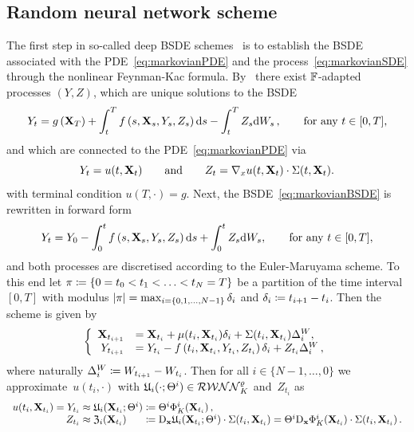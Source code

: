 \subsection{Random neural network scheme}
The first step in so-called deep BSDE schemes~\cite{E2017DeepEquations, Han2018SolvingLearning, Hure2020DeepPDEs} is to establish the BSDE associated with the PDE~\eqref{eq:markovianPDE} and the process~\eqref{eq:markovianSDE} through the nonlinear Feynman-Kac formula. By~\cite{Pardoux1990AdaptedEquation} there exist $\mathbb{F}$-adapted processes $(Y, Z)$, which are unique solutions to the BSDE
\begin{equation}\label{eq:markovianBSDE}
Y_{t}=g\left(\mathbf{X}_{T}\right)+\int_{t}^{T} f\left(s, \mathbf{X}_{s}, Y_{s}, Z_{s}\right) \mathrm{d} s-\int_{t}^{T} Z_{s} \mathrm{d} W_{s}\,,
\qquad\text{for any } t \in [0,T],
\end{equation}
and which are connected to the PDE~\eqref{eq:markovianPDE} via
$$
Y_t = u(t, \mathbf{X}_t) \qquad \text{and} \qquad Z_t = \nabla_x u(t,\mathbf{X}_t)\cdot\Sigma(t,\mathbf{X}_t).  
$$
with terminal condition $u(T, \cdot)=g$. Next, the BSDE~\eqref{eq:markovianBSDE} is rewritten in forward form
\begin{equation*}
    Y_{t}=Y_0 - \int_{0}^{t} f\left(s, \mathbf{X}_{s}, Y_{s}\textbf{}, Z_{s}\right) \mathrm{d} s + \int_{0}^{t} Z_{s} \mathrm{d} W_{s}\textbf{},
\qquad\text{for any }t \in [0,T]\textbf{},
\end{equation*}
and both processes are discretised according to the Euler-Maruyama scheme. To this end let $\pi\coloneqq \left\{0=t_{0}<t_{1}<\ldots<t_{N}=T\right\}$ be a partition of the time interval $[0,T]$ with modulus $|\pi|=\max_{i=\{0,1, \dots, N-1\}} \delta_{i} $ and $\delta_{i} \coloneqq  t_{i+1}-t_{i}$. Then the scheme is given by
\begin{equation}\label{eq:EulerMaruyama}
\left\{
\begin{array}{rl}
    \mathbf{X}_{t_{i+1}} &= \mathbf{X}_{t_{i}} + \mu(t_{i}, \mathbf{X}_{t_{i}})\delta_{i}  + \Sigma(t_{i}, \mathbf{X}_{t_{i}})\Delta^{W}_{i}\textbf{}, \\
    Y_{t_{i+1}} &= Y_{t_{i}} - f\left(t_{i}, \mathbf{X}_{t_{i}}, Y_{t_{i}}, Z_{t_i}\right)\delta_{i} + Z_{t_i}\Delta^{W}_{i}\,,
\end{array}
\right.
\end{equation}
where naturally $\Delta^{W}_{i}\coloneqq  W_{t_{i+1}} - W_{t_i}$.
Then for all $i\in\{N-1,\dots,0\}$ we approximate~$u(t_i,\cdot)$ with $\mathfrak{U}_i(\cdot;\Theta^i)\in\mathcal{RWNN}_{K}^\varrho$ 
and~$Z_{t_i}$ as
\begin{equation*}
\begin{array}{rll}
u(t_i,\XX_{t_i}) = Y_{t_i}
&\hspace*{-0.25cm}\approx \Uf_i(\XX_{t_i};\Theta^i)
&\hspace*{-0.25cm}\defEqual\Theta^i \Phi_K^i(\XX_{t_i})\,,\\
Z_{t_i} &\hspace*{-0.25cm}\approx \Zf_{i}(\XX_{t_i}) 
&\hspace*{-0.25cm}\defEqual \Dxx \Uf_i(\XX_{t_i};\Theta^i)\cdot\Sigma(t_i,\XX_{t_i})
 = \Theta^i \Dxx \Phi_K^i(\XX_{t_i})\cdot\Sigma(t_i,\XX_{t_i})\,.
 \end{array}
\end{equation*}
